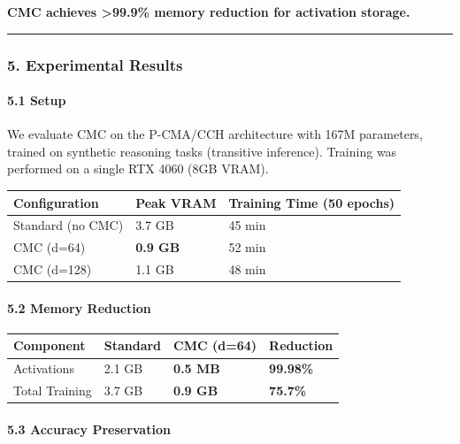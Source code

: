 \documentclass[
  11pt,
  a4paper,
]{article}
\begin{document}
\textbf{CMC achieves \textgreater99.9\% memory reduction for activation
storage.}

\begin{center}\rule{0.5\linewidth}{0.5pt}\end{center}

\subsubsection{5. Experimental Results}\label{experimental-results-1}

\paragraph{5.1 Setup}\label{setup}

We evaluate CMC on the P-CMA/CCH architecture with 167M parameters,
trained on synthetic reasoning tasks (transitive inference). Training
was performed on a single RTX 4060 (8GB VRAM).

\begin{longtable}[]{@{}lll@{}}
\toprule\noalign{}
Configuration & Peak VRAM & Training Time (50 epochs) \\
\midrule\noalign{}
\endhead
\bottomrule\noalign{}
\endlastfoot
Standard (no CMC) & 3.7 GB & 45 min \\
CMC (d=64) & \textbf{0.9 GB} & 52 min \\
CMC (d=128) & 1.1 GB & 48 min \\
\end{longtable}

\paragraph{5.2 Memory Reduction}\label{memory-reduction}

\begin{longtable}[]{@{}llll@{}}
\toprule\noalign{}
Component & Standard & CMC (d=64) & Reduction \\
\midrule\noalign{}
\endhead
\bottomrule\noalign{}
\endlastfoot
Activations & 2.1 GB & \textbf{0.5 MB} & \textbf{99.98\%} \\
Total Training & 3.7 GB & \textbf{0.9 GB} & \textbf{75.7\%} \\
\end{longtable}

\paragraph{5.3 Accuracy Preservation}\label{accuracy-preservation}
\end{document}
